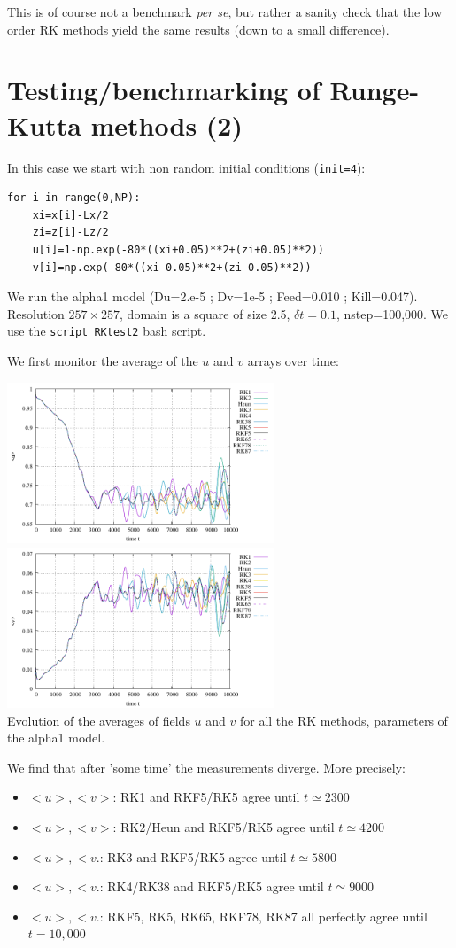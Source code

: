 This is of course not a benchmark {\it per se}, but rather a sanity check that 
the low order RK methods yield the same results (down to a small difference).


\newpage
\section*{Testing/benchmarking of Runge-Kutta methods (2)}

In this case we start with non random initial conditions (\lstinline{init=4}):
\begin{lstlisting}
for i in range(0,NP):
    xi=x[i]-Lx/2
    zi=z[i]-Lz/2
    u[i]=1-np.exp(-80*((xi+0.05)**2+(zi+0.05)**2))
    v[i]=np.exp(-80*((xi-0.05)**2+(zi-0.05)**2))
\end{lstlisting}
We run the alpha1 model (Du=2.e-5 ; Dv=1e-5 ; Feed=0.010 ; Kill=0.047). 
Resolution $257\times 257$, domain is a square of size 2.5, 
$\delta t=0.1$, nstep=100,000.
We use the {\tt script\_RKtest2} bash script.

We first monitor the average of the $u$ and $v$ arrays over time:
\begin{center}
\includegraphics[width=8cm]{python_codes/fieldstone_171/RKtest2/avrg_u.pdf}
\includegraphics[width=8cm]{python_codes/fieldstone_171/RKtest2/avrg_v.pdf}\\
{\captionfont Evolution of the averages of fields $u$
and $v$ for all the RK methods, parameters of the alpha1 model.}
\end{center}
We find that after 'some time'  the measurements diverge. 
More precisely:
\begin{itemize}
\item $<u>,<v>$: RK1      and RKF5/RK5 agree until $t\simeq 2300$
\item $<u>,<v>$: RK2/Heun and RKF5/RK5 agree until $t\simeq 4200$
\item $<u>,<v.$: RK3      and RKF5/RK5 agree until $t\simeq 5800$
\item $<u>,<v.$: RK4/RK38 and RKF5/RK5 agree until $t\simeq 9000$
\item $<u>,<v.$: RKF5, RK5, RK65, RKF78, RK87 all perfectly agree until $t=10,000$
\end{itemize}


